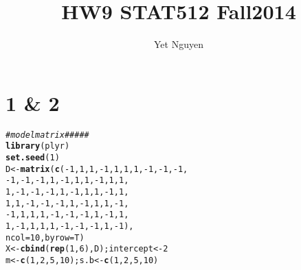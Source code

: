 \documentclass{article}\usepackage[]{graphicx}\usepackage[]{color}
\makeatletter
\newcommand{\hlnum}[1]{\textcolor[rgb]{0.686,0.059,0.569}{#1}}%
\newcommand{\hlcom}[1]{\textcolor[rgb]{0.678,0.584,0.686}{\textit{#1}}}%
\newcommand{\hlopt}[1]{\textcolor[rgb]{0,0,0}{#1}}%
\newcommand{\hlstd}[1]{\textcolor[rgb]{0.345,0.345,0.345}{#1}}%
\newcommand{\hlkwb}[1]{\textcolor[rgb]{0.69,0.353,0.396}{#1}}%
\newcommand{\hlkwc}[1]{\textcolor[rgb]{0.333,0.667,0.333}{#1}}%
\newcommand{\hlkwd}[1]{\textcolor[rgb]{0.737,0.353,0.396}{\textbf{#1}}}%
\newenvironment{kframe}{%
 \def\at@end@of@kframe{}%
 \ifinner\ifhmode%
  \def\at@end@of@kframe{\end{minipage}}%
  \begin{minipage}{\columnwidth}%
 \fi\fi%
 \def\FrameCommand##1{\hskip\@totalleftmargin \hskip-\fboxsep
 \colorbox{shadecolor}{##1}\hskip-\fboxsep
     \hskip-\linewidth \hskip-\@totalleftmargin \hskip\columnwidth}%
 \MakeFramed {\advance\hsize-\width
   \@totalleftmargin\z@ \linewidth\hsize
   \@setminipage}}%
 {\par\unskip\endMakeFramed%
 \at@end@of@kframe}
\makeatother
\begin{document}
\title{HW9 STAT512 Fall2014}

\author{Yet Nguyen}
  
\maketitle
\section*{1 \& 2}
\begin{kframe}
\begin{alltt}
\hlcom{# model matrix#####}
\hlkwd{library}\hlstd{(plyr)}
\hlkwd{set.seed}\hlstd{(}\hlnum{1}\hlstd{)}
\hlstd{D} \hlkwb{<-} \hlkwd{matrix}\hlstd{(}\hlkwd{c}\hlstd{(}\hlopt{-}\hlnum{1}\hlstd{,} \hlnum{1}\hlstd{,} \hlnum{1}\hlstd{,} \hlopt{-}\hlnum{1}\hlstd{,} \hlnum{1}\hlstd{,} \hlnum{1}\hlstd{,} \hlnum{1}\hlstd{,} \hlopt{-}\hlnum{1}\hlstd{,} \hlopt{-}\hlnum{1}\hlstd{,} \hlopt{-}\hlnum{1}\hlstd{,}
              \hlopt{-}\hlnum{1}\hlstd{,} \hlopt{-}\hlnum{1}\hlstd{,} \hlopt{-}\hlnum{1}\hlstd{,} \hlnum{1}\hlstd{,} \hlopt{-}\hlnum{1}\hlstd{,} \hlnum{1}\hlstd{,} \hlnum{1}\hlstd{,} \hlopt{-}\hlnum{1}\hlstd{,} \hlnum{1}\hlstd{,} \hlnum{1}\hlstd{,}
              \hlnum{1}\hlstd{,} \hlopt{-}\hlnum{1}\hlstd{,} \hlopt{-}\hlnum{1}\hlstd{,} \hlopt{-}\hlnum{1}\hlstd{,} \hlnum{1}\hlstd{,} \hlopt{-}\hlnum{1}\hlstd{,} \hlnum{1}\hlstd{,} \hlnum{1}\hlstd{,} \hlopt{-}\hlnum{1}\hlstd{,} \hlnum{1}\hlstd{,}
              \hlnum{1}\hlstd{,} \hlnum{1}\hlstd{,} \hlopt{-}\hlnum{1}\hlstd{,} \hlopt{-}\hlnum{1}\hlstd{,} \hlopt{-}\hlnum{1}\hlstd{,} \hlnum{1}\hlstd{,} \hlopt{-}\hlnum{1}\hlstd{,} \hlnum{1}\hlstd{,} \hlnum{1}\hlstd{,} \hlopt{-}\hlnum{1}\hlstd{,}
              \hlopt{-}\hlnum{1}\hlstd{,} \hlnum{1}\hlstd{,} \hlnum{1}\hlstd{,} \hlnum{1}\hlstd{,} \hlopt{-}\hlnum{1}\hlstd{,} \hlopt{-}\hlnum{1}\hlstd{,} \hlopt{-}\hlnum{1}\hlstd{,} \hlnum{1}\hlstd{,} \hlopt{-}\hlnum{1}\hlstd{,} \hlnum{1}\hlstd{,}
              \hlnum{1}\hlstd{,} \hlopt{-}\hlnum{1}\hlstd{,} \hlnum{1}\hlstd{,} \hlnum{1}\hlstd{,} \hlnum{1}\hlstd{,} \hlopt{-}\hlnum{1}\hlstd{,} \hlopt{-}\hlnum{1}\hlstd{,} \hlopt{-}\hlnum{1}\hlstd{,} \hlnum{1}\hlstd{,} \hlopt{-}\hlnum{1}\hlstd{),}
            \hlkwc{ncol} \hlstd{=} \hlnum{10}\hlstd{,} \hlkwc{byrow} \hlstd{= T)}
\hlstd{X} \hlkwb{<-} \hlkwd{cbind}\hlstd{(}\hlkwd{rep}\hlstd{(}\hlnum{1}\hlstd{,} \hlnum{6}\hlstd{), D); intercept} \hlkwb{<-} \hlnum{2}
\hlstd{m} \hlkwb{<-} \hlkwd{c}\hlstd{(}\hlnum{1}\hlstd{,} \hlnum{2}\hlstd{,} \hlnum{5}\hlstd{,} \hlnum{10}\hlstd{); s.b} \hlkwb{<-} \hlkwd{c}\hlstd{(}\hlnum{1}\hlstd{,} \hlnum{2}\hlstd{,} \hlnum{5}\hlstd{,} \hlnum{10}\hlstd{)}

\end{alltt}
\end{kframe}
\end{document}
